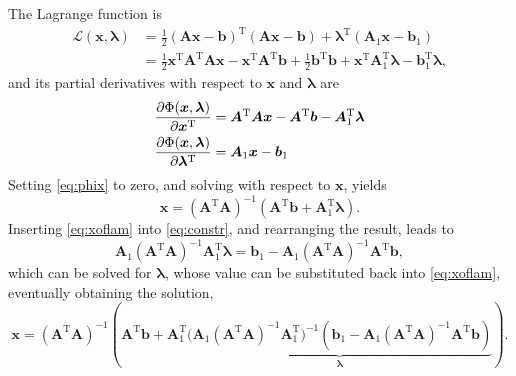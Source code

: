 \documentclass[b5paper,oneside]{article}
\begin{document}
The Lagrange function is
\begin{align*}
  \mathcal{L}(\bm x, \bm \lambda) &= \frac{1}{2}(\bm A \bm x - \bm b)^\text{T}(\bm A \bm x - \bm b) + \bm \lambda^\text{T}(\bm A_1 \bm x - \bm b_1)\\
                                  &= \frac{1}{2}\bm x^\text{T} \bm A^\text{T} \bm A \bm x - \bm x^\text{T} \bm A^\text{T} \bm b + \frac{1}{2}\bm b^\text{T} \bm b + \bm x^\text{T} \bm A_1^\text{T} \bm \lambda - \bm b_1^\text{T} \bm \lambda,
\end{align*}
and its partial derivatives with respect to $\bm x$ and $\bm \lambda$ are
\begin{align}
  \frac{\partial \Phi (\bm x, \bm \lambda)}{\partial \bm x^\text{T}} &= \bm A^\text{T} \bm A \bm x - \bm A^\text{T} \bm b - \bm A_1^\text{T} \bm \lambda\label{eq:phix}\\
  \frac{\partial \Phi (\bm x, \bm \lambda)}{\partial \bm \lambda^\text{T}} &= \bm A_1 \bm x - \bm b_1\notag
\end{align}
Setting \cref{eq:phix} to zero, and solving with respect to $\bm x$, yields
\begin{equation}
  \bm x = (\bm A^\text{T} \bm A)^{-1} (\bm A^\text{T} \bm b + \bm A_1^\text{T} \bm \lambda). \label{eq:xoflam}
\end{equation}
Inserting \cref{eq:xoflam} into \cref{eq:constr}, and rearranging the result,
leads to
\begin{equation*}
  \bm A_1 (\bm A^\text{T} \bm A)^{-1} \bm A_1^\text{T} \bm \lambda = \bm b_1 -
  \bm A_1 (\bm A^\text{T} \bm A)^{-1} \bm A^\text{T} \bm b,
\end{equation*}
which can be solved for $\bm \lambda$, whose value can be substituted back into
\cref{eq:xoflam}, eventually obtaining the solution,
\begin{equation*}
  \bm x = (\bm A^\text{T} \bm A)^{-1} (\bm A^\text{T} \bm b + \bm A_1^\text{T} \underbrace{(\bm A_1 (\bm A^\text{T} \bm A)^{-1} \bm A_1^\text{T} \bm)^{-1}(\bm b_1 -
  \bm A_1 (\bm A^\text{T} \bm A)^{-1} \bm A^\text{T} \bm b)}_{\displaystyle \bm \lambda}).
\end{equation*}
\end{document}

